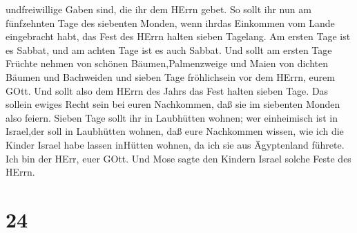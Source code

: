 undfreiwillige Gaben sind, die ihr dem HErrn gebet.  So
sollt ihr nun am fünfzehnten Tage des siebenten Monden, wenn ihrdas
Einkommen vom Lande eingebracht habt, das Fest des HErrn halten sieben
Tagelang. Am ersten Tage ist es Sabbat, und am achten Tage ist es auch
Sabbat.  Und sollt am ersten Tage Früchte nehmen von
schönen Bäumen,Palmenzweige und Maien von dichten Bäumen und Bachweiden
und sieben Tage fröhlichsein vor dem HErrn, eurem GOtt. 
Und sollt also dem HErrn des Jahrs das Fest halten sieben Tage. Das
sollein ewiges Recht sein bei euren Nachkommen, daß sie im siebenten
Monden also feiern.  Sieben Tage sollt ihr in Laubhütten
wohnen; wer einheimisch ist in Israel,der soll in Laubhütten wohnen,
 daß eure Nachkommen wissen, wie ich die Kinder Israel habe
lassen inHütten wohnen, da ich sie aus Ägyptenland führete. Ich bin der
HErr, euer GOtt.  Und Mose sagte den Kindern Israel solche
Feste des HErrn.

\hypertarget{section-23}{%
\section{24}\label{section-23}}

